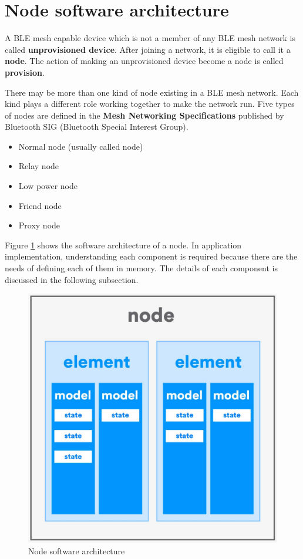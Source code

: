 \documentclass[\main/main.tex]{subfiles}
\begin{document}
\section{Node software architecture}

A BLE mesh capable device which is not a member of any BLE mesh network is called \textbf{unprovisioned device}. After joining a  network, it is eligible to call it a \textbf{node}. The action of making an unprovisioned device become a node is called \textbf{provision}.

There may be more than one kind of node existing in a BLE mesh network. Each kind plays a different role working together to make the network run. Five types of nodes are defined in the \textbf{Mesh Networking Specifications} published by Bluetooth SIG (Bluetooth Special Interest Group).
\begin{itemize}
    \item Normal node (usually called node)
    \item Relay node
    \item Low power node
    \item Friend node
    \item Proxy node
\end{itemize}

Figure \ref{fig:Node software architecture} shows the software architecture of a node. In application implementation, understanding each component is required because there are the needs of defining each of them in memory. The details of each component is discussed in the following subsection.
\begin{figure}[H]
    \begin{center}
        \includegraphics[scale=0.15]{node_software_architecture.jpg}
    \end{center}
    \caption{Node software architecture}
    \label{fig:Node software architecture}
\end{figure}
\end{document}
